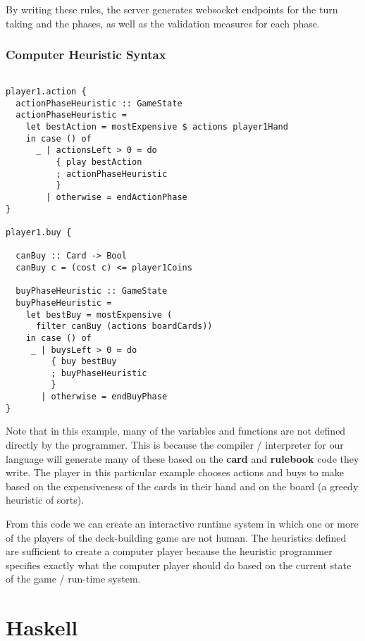 \documentclass{acm_proc_article-sp}
\begin{document}
By writing these rules, the server generates websocket endpoints for the turn taking and the phases, as well as the validation measures for each phase.

\subsubsection{Computer Heuristic Syntax}
\begin{verbatim}

player1.action {
  actionPhaseHeuristic :: GameState
  actionPhaseHeuristic =
    let bestAction = mostExpensive $ actions player1Hand
    in case () of
      _ | actionsLeft > 0 = do
          { play bestAction
          ; actionPhaseHeuristic
          }
        | otherwise = endActionPhase
}

player1.buy {

  canBuy :: Card -> Bool
  canBuy c = (cost c) <= player1Coins

  buyPhaseHeuristic :: GameState
  buyPhaseHeuristic =
    let bestBuy = mostExpensive (
      filter canBuy (actions boardCards))
    in case () of
     _ | buysLeft > 0 = do
         { buy bestBuy
         ; buyPhaseHeuristic
         }
       | otherwise = endBuyPhase
}

\end{verbatim}

Note that in this example, many of the variables and functions are not defined directly
by the programmer. This is because the compiler / interpreter for our language will generate
many of these based on the {\bf card} and {\bf rulebook} code they write. The player in this
particular example chooses actions and buys to make based on the expensiveness of the cards
in their hand and on the board (a greedy heuristic of sorts).

From this code we can create an interactive runtime system in which one or more of the players
of the deck-building game are not human. The heuristics defined are sufficient to create a
computer player because the heuristic programmer specifies exactly what the computer player
should do based on the current state of the game / run-time system.

\section{Haskell}
\label{sec:haskell}
\end{document}
